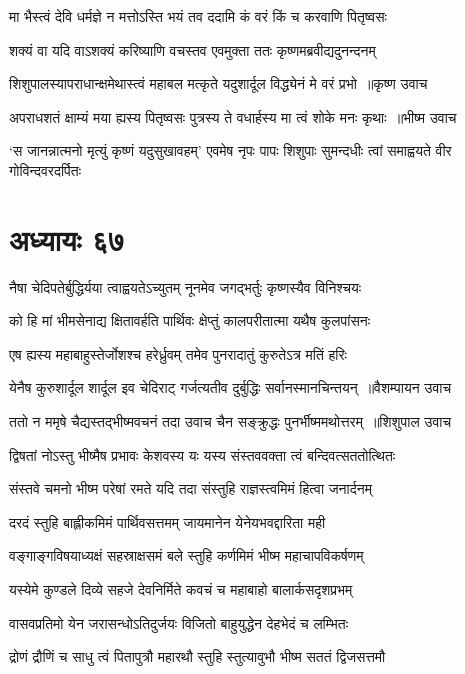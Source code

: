 \twolineshloka
{मा भैस्त्वं देवि धर्मज्ञे न मत्तोऽस्ति भयं तव}
{ददामि कं वरं किं च करवाणि पितृष्वसः}


\twolineshloka
{शक्यं वा यदि वाऽशक्यं करिष्याणि वचस्तव}
{एवमुक्ता ततः कृष्णमब्रवीद्यदुनन्दनम्}


\threelineshloka
{शिशुपालस्यापराधान्क्षमेथास्त्वं महाबल}
{मत्कृते यदुशार्दूल विद्ध्येनं मे वरं प्रभो ॥कृष्ण उवाच}
{}


\threelineshloka
{अपराधशतं क्षाम्यं मया ह्यस्य पितृष्वसः}
{पुत्रस्य ते वधार्हस्य मा त्वं शोके मनः कृथाः ॥भीष्म उवाच}
{}


\threelineshloka
{`स जानन्नात्मनो मृत्युं कृष्णं यदुसुखावहम्'}
{एवमेष नृपः पापः शिशुपाः सुमन्दधीः}
{त्वां समाह्वयते वीर गोविन्दवरदर्पितः}


\chapter{अध्यायः ६७}
\threelineshloka
{नैषा चेदिपतेर्बुद्धिर्यया त्वाह्वयतेऽच्युतम्}
{नूनमेव जगद्भर्तुः कृष्णस्यैव विनिश्चयः}
{}


\twolineshloka
{को हि मां भीमसेनाद्य क्षितावर्हति पार्थिवः}
{क्षेप्तुं कालपरीतात्मा यथैष कुलपांसनः}


\twolineshloka
{एष ह्यस्य महाबाहुस्तेर्जोशश्च हरेर्ध्रुवम्}
{तमेव पुनरादातुं कुरुतेऽत्र मतिं हरिः}


\twolineshloka
{येनैष कुरुशार्दूल शार्दूल इव चेदिराट्}
{गर्जत्यतीव दुर्बुद्धिः सर्वानस्मानचिन्तयन् ॥वैशम्पायन उवाच}


\twolineshloka
{ततो न ममृषे चैद्यस्तद्भीष्मवचनं तदा}
{उवाच चैन सङ्क्रुद्धः पुनर्भीष्ममथोत्तरम् ॥शिशुपाल उवाच}


\twolineshloka
{द्विषतां नोऽस्तु भीष्मैष प्रभावः केशवस्य यः}
{यस्य संस्तववक्ता त्वं बन्दिवत्सततोत्थितः}


\twolineshloka
{संस्तवे चमनो भीष्म परेषां रमते यदि}
{तदा संस्तुहि राज्ञस्त्वमिमं हित्वा जनार्दनम्}


\twolineshloka
{दरदं स्तुहि बाह्लीकमिमं पार्थिवसत्तमम्}
{जायमानेन येनेयभवद्दारिता मही}


\twolineshloka
{वङ्गाङ्गविषयाध्यक्षं सहस्राक्षसमं बले}
{स्तुहि कर्णमिमं भीष्म महाचापविकर्षणम्}


\twolineshloka
{यस्येमे कुण्डले दिव्ये सहजे देवनिर्मिते}
{कवचं च महाबाहो बालार्कसदृशप्रभम्}


\twolineshloka
{वासवप्रतिमो येन जरासन्धोऽतिदुर्जयः}
{विजितो बाहुयुद्धेन देहभेदं च लम्भितः}


\twolineshloka
{द्रोणं द्रौणिं च साधु त्वं पितापुत्रौ महारथौ}
{स्तुहि स्तुत्यावुभौ भीष्म सततं द्विजसत्तमौ}


